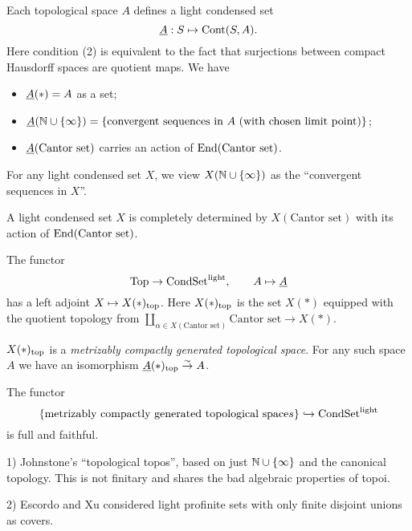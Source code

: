 \documentclass{notes}
\begin{document}
\begin{example}
Each topological space $A$ defines a light condensed set 
$$
  \underline{A}: S\mapsto{\rm Cont}(S,A).
$$
Here condition (2) is equivalent to the fact that surjections between
compact Hausdorff spaces are quotient maps. We have
\begin{itemize}
\item $\underline{A}(*) = A$ as a set; 
\item $\underline{A}({\mathbb{N}}\cup\{\infty\}) = \{\text{convergent sequences in $A$
  (with chosen limit point)}\}$;
\item $\underline{A}(\text{Cantor set})$ carries an action of
  $\mathrm{ End}(\text{Cantor set})$. 
\end{itemize}
\end{example}

For any light condensed set $X$, we view $X({\mathbb{N}}\cup\{\infty\})$ as the
``convergent sequences in $X$''. 

\begin{remark}
A light condensed set $X$ is completely determined by $X(\text{Cantor
  set})$ with its action of $\mathrm{ End}(\text{Cantor set})$.
\end{remark}

\begin{prop}
The functor
$$
  \text{Top} \to \text{CondSet}^{\rm light},\qquad A\mapsto\underline{A}
$$
has a left adjoint $X\mapsto X(*)_{\rm top}$. Here $X(*)_{\rm top}$ is
the set $X(*)$ equipped with the quotient topology from
$\coprod_{\alpha\in X(\text{Cantor set})}\text{Cantor set} \to X(*)$.
\end{prop}

\begin{remark}
$X(*)_{\rm top}$ is a {\em metrizably compactly generated topological
  space}. For any such space $A$ we have an isomorphism
  $\underline{A}(*)_{\rm top}\stackrel{\sim}\to A$. 
\end{remark}

\begin{cor}
The functor
$$
  \{\text{metrizably compactly generated topological space}s\} \hookrightarrow
  \text{CondSet}^{\rm light}
$$
is full and faithful. 
\end{cor}

\begin{rem}
1) Johnstone's ``topological topos'', based on just ${\mathbb{N}}\cup\{\infty\}$
and the canonical topology. This is not finitary and shares the bad
algebraic properties of topoi. 

2) Escordo and Xu considered light profinite sets with only finite
disjoint unions as covers. 
\end{rem}
\end{document}
